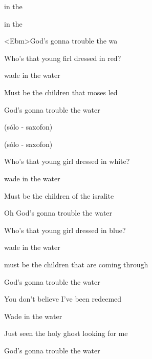 

\zr
{}   in the  
 
   in the   

    

<Ebm>God's gonna trouble the wa
\kr

\zs
Who's that young firl dressed in red?

wade in the water

Must be the children that moses led

God's gonna trouble the water
\ks

\zr\kr

\zs
(sólo - saxofon)
\ks

\zr
(sólo - saxofon)
\kr

\zs
Who's that young girl dressed in white?

wade in the water

Must be the children of the isralite

Oh God's gonna trouble the water
\ks

\zr\kr

\zs
Who's that young girl dressed in blue?

wade in the water

must be the children that are coming through

God's gonna trouble the water
\ks

\zr\kr

\zs
You don't believe I've been redeemed

Wade in the water 

Just seen the holy ghost looking for me

God's gonna trouble the water
\ks

\zr\kr

\kp

